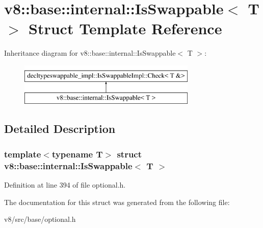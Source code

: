 \hypertarget{structv8_1_1base_1_1internal_1_1IsSwappable}{}\section{v8\+:\+:base\+:\+:internal\+:\+:Is\+Swappable$<$ T $>$ Struct Template Reference}
\label{structv8_1_1base_1_1internal_1_1IsSwappable}
Inheritance diagram for v8\+:\+:base\+:\+:internal\+:\+:Is\+Swappable$<$ T $>$\+:\begin{figure}[H]
\begin{center}
\leavevmode
\includegraphics[height=2.000000cm]{structv8_1_1base_1_1internal_1_1IsSwappable}
\end{center}
\end{figure}


\subsection{Detailed Description}
\subsubsection*{template$<$typename T$>$\newline
struct v8\+::base\+::internal\+::\+Is\+Swappable$<$ T $>$}



Definition at line 394 of file optional.\+h.



The documentation for this struct was generated from the following file\+:\begin{DoxyCompactItemize}
\item 
v8/src/base/optional.\+h\end{DoxyCompactItemize}
